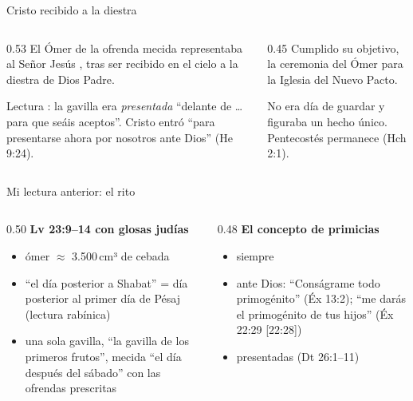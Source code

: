 \begin{frame}{Cristo recibido a la diestra}
\begin{columns}[t,onlytextwidth]
\begin{column}{0.53\textwidth}
\small\RaggedRight El Ómer de la ofrenda mecida representaba al Señor Jesús , tras ser recibido en el cielo a la diestra de Dios Padre.\par\smallskip
\scriptsize\RaggedRight Lectura : la gavilla era \emph{presentada} ``delante de \SENOR{}\ldots{} para que seáis aceptos''. Cristo entró ``para presentarse ahora por nosotros ante Dios'' (He 9:24).
\end{column}
\begin{column}{0.45\textwidth}
\small\RaggedRight Cumplido su objetivo, la ceremonia del Ómer  para la Iglesia del Nuevo Pacto.\par\smallskip
\scriptsize\RaggedRight No era día de guardar y figuraba un hecho único. Pentecostés permanece (Hch 2:1).\par\smallskip
{}
\end{column}
\end{columns}
\end{frame}

\begin{frame}{Mi lectura anterior: el rito}
\begin{columns}[t,onlytextwidth]
\begin{column}{0.50\textwidth}\small\RaggedRight
\textbf{\color{tierraroja}Lv 23:9--14 con glosas judías}
\begin{itemize}
\item ómer $\approx$ 3.500\,cm³ de cebada
\item ``el día posterior a Shabat'' = día posterior al primer día de Pésaj (lectura rabínica)
\item una sola gavilla, ``la gavilla de los primeros frutos'', mecida ``el día después del sábado'' con las ofrendas prescritas
\end{itemize}
\end{column}
\begin{column}{0.48\textwidth}\small\RaggedRight
\textbf{\color{tierraroja}El concepto de primicias}
\begin{itemize}
\item siempre 
\item {} ante Dios: ``Conságrame todo primogénito'' (Éx 13:2); ``me darás el primogénito de tus hijos'' (Éx 22:29 [22:28])
\item presentadas  (Dt 26:1--11)
\end{itemize}
\end{column}
\end{columns}
\end{frame}

